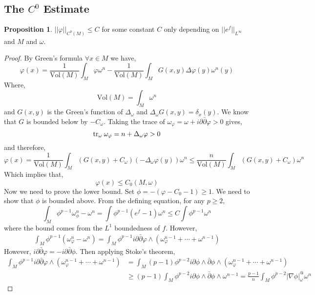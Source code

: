 \documentclass[12pt]{extarticle}
\theoremstyle{definition}
\newtheorem{proposition}[theorem]{Proposition}
\begin{document}
\subsection{The $C^0$ Estimate}

\newcommand{\Vol}[1]{\mathrm{Vol}\left(#1\right)}

\begin{proposition}
$|| \varphi ||_{C^0(M)} \le C$ for some constant $C$ only depending on $||e^f||_{L^\infty}$ and $M$ and $\omega$.
\end{proposition}

\begin{proof}
By Green's formula $\forall x \in M$ we have,
\[ \varphi(x) = \frac{1}{\Vol{M}} \int_M \varphi \omega^n - \frac{1}{\Vol{M}} \int_M G(x, y) \Delta \varphi(y) \omega^n(y) \]
Where,
\[ \Vol{M} = \int_M \omega^n \]
and $G(x,y)$ is the Green's function of $\Delta_\omega$ and $\Delta_\omega G(x, y) = \delta_x(y)$. We know that $G$ is bounded below by $- C_\omega$. Taking the trace of $\omega_\varphi = \omega + i \partial \bar{\partial} \varphi > 0$ gives, 
\[ \mathrm{tr}_{\omega} \:{\omega_\varphi} = n + \Delta_\omega \varphi > 0 \]
and therefore,
\[ \varphi(x) = \frac{1}{\Vol{M}} \int_M \left( G(x, y) + C_\omega \right) \left( - \Delta_\omega \varphi(y) \right) \omega^n \le \frac{n}{\Vol{M}} \int_M \left( G(x, y) + C_\omega \right) \omega^n \]
Which implies that,
\[ \varphi(x) \le C_0(M, \omega) \]
Now we need to prove the lower bound. Set $\phi = - \left( \varphi - C_0 - 1 \right) \ge 1$. We need to show that $\phi$ is bounded above. From the defining equation, for any $p \ge 2$,
\[ \int_M \phi^{p - 1} \omega_\phi^n - \omega^n = \int \phi^{p-1} \left( e^f - 1 \right) \omega^n \le C \int \phi^{p - 1} \omega^n \]
where the bound comes from the $L^1$ boundedness of $f$. However,
\begin{align*}
\int_M \phi^{p - 1} \left( \omega^n_\varphi - \omega^n \right) = \int_M \phi^{p-1} i \partial \bar{\partial} \varphi \wedge \left( \omega_\varphi^{n-1} + \cdots + \omega^{n - 1} \right)
\end{align*}
However, $i \partial \bar{\partial} \varphi = - i \partial \bar{\partial} \phi$. Then applying Stoke's theorem,
\begin{align*}
\int_M \phi^{p-1} i \partial \bar{\partial} \varphi \wedge \left( \omega_\varphi^{n-1} + \cdots + \omega^{n - 1} \right) 
& = \int_M (p - 1) \phi^{p-2} i \partial \phi \wedge \bar{\partial} \phi \wedge \left( \omega_\varphi^{n- 1} + \cdots + \omega^{n-1} \right) 
\\
& \ge (p-1) \int_M \phi^{p-2} i \partial \phi \wedge \bar{\partial} \phi \wedge \omega^{n-1} = \frac{p-1}{n} \int_M \phi^{p-2} |\nabla \phi |_{\omega}^@ \omega^n

\end{align*}
\end{proof}
\end{document}
